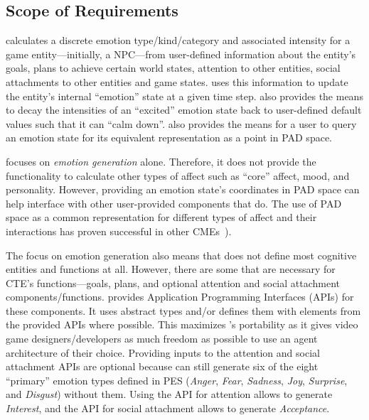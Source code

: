 \subsection{Scope of Requirements}\label{sec:doc_reqscope}
\progname{} calculates a discrete emotion type/kind/category and associated
intensity for a game entity---initially, a NPC---from user-defined information
about the entity's goals, plans to achieve certain world states, attention to
other entities, social attachments to other entities and game states.
\progname{} uses this information to update the entity's internal ``emotion''
state at a given time step. \progname{} also provides the means to decay the
intensities of an ``excited'' emotion state back to user-defined default values
such that it can ``calm down''. \progname{} also provides the means for a user
to query an emotion state for its equivalent representation as a point in PAD
space.

\progname{} focuses on \textit{emotion generation} alone. Therefore, it does
not provide the functionality to calculate other types of affect such as
``core'' affect, mood, and personality. However, providing an emotion state's
coordinates in PAD space can help \progname{} interface with other
user-provided components that do. The use of PAD space as a common
representation for different types of affect and their interactions has proven
successful in other CMEs~\citep{broekens2004scalable, gebhard2005alma,
masuyama2018personality}).

The focus on emotion generation also means that \progname{} does not define
most cognitive entities and functions at all. However, there are some that are
necessary for CTE's functions---goals, plans, and optional attention and social
attachment components/functions. \progname{} provides Application Programming
Interfaces (APIs) for these components. It uses abstract types and/or defines
them with elements from the provided APIs where possible. This maximizes
\progname{}'s portability as it gives video game designers/developers as much
freedom as possible to use an agent architecture of their choice. Providing
inputs to the attention and social attachment APIs are optional because
\progname{} can still generate six of the eight ``primary'' emotion types
defined in PES (\textit{Anger}, \textit{Fear}, \textit{Sadness}, \textit{Joy},
\textit{Surprise}, and \textit{Disgust}) without them. Using the API for
attention allows \progname{} to generate \textit{Interest}, and the API for
social attachment allows \progname{} to generate \textit{Acceptance}.

